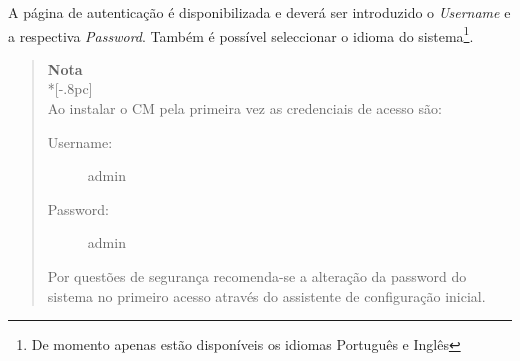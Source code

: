 

A página de autenticação é disponibilizada e deverá ser introduzido o \emph{Username} e a respectiva \emph{Password}. Também é possível seleccionar o idioma do sistema\footnote{De momento apenas estão disponíveis os idiomas Português e Inglês}.

\begin{quote}
	{\large \bf Nota} \\*[-.8pc]
	\underline{\hspace{6in}} \\
	Ao instalar o CM pela primeira vez as credenciais de acesso são:
	\begin{description}
        	\item[Username:] admin
	        \item[Password:] admin
	\end{description}
	Por questões de segurança recomenda-se a alteração da password do sistema no primeiro acesso através do assistente de configuração inicial.

\end{quote}

